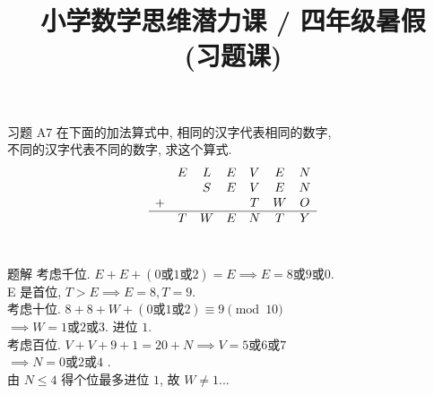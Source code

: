 \documentclass[content.tex]{subfiles}
\title{小学数学思维潜力课 / 四年级暑假 \\ (习题课)}
\begin{document}
\begin{frame}
\maketitle
\end{frame}

\begin{frame}{习题 A7}
在下面的加法算式中, 相同的汉字代表相同的数字, \\ 不同的汉字代表不同的数字, 求这个算式.
$$
\begin{matrix}
  & E & L & E & V & E & N \\
  &   & S & E & V & E & N \\
+ &   &   &   & T & W & O \\
\hline
  & T & W & E & N & T & Y \\
\end{matrix}
$$
\\[-1em]
\begin{exampleblock}{题解}
考虑千位. $E+E+(0\text{或}1\text{或}2)=E\implies
E=8\text{或}9\text{或}0$. \\
\qquad E 是首位, $T > E \implies E = 8, T = 9$. \\
考虑十位. $8+8+W+(0\text{或}1\text{或}2)\equiv 9\pmod{10}$ \\
\qquad $\implies W=1\text{或}2\text{或}3$. 进位 $1$. \\
考虑百位. $V+V+9+1=20+N\implies V=5\text{或}6\text{或}7$ \\
\qquad $\implies N=0\text{或}2\text{或}4$ . \\
由 $N \le 4$ 得个位最多进位 $1$, 故 $W \neq 1$...
\end{exampleblock}
\end{frame}
\end{document}
